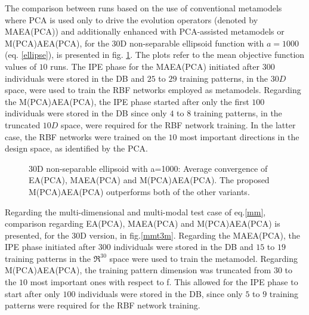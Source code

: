 The comparison between  runs based on the use of conventional metamodels where PCA is used only to drive the evolution operators (denoted by MAEA(PCA)) and additionally enhanced with PCA-assisted metamodels  or M(PCA)AEA(PCA), for the 30D non-separable ellipsoid function with $a=1000$ (eq. \ref{ellipse}), is presented in fig. \ref{Ellt3-m}. The plots refer to the mean objective function values of $10$ runs. The IPE phase for the MAEA(PCA) initiated after $300$ individuals were stored in the DB and $25$ to $29$ training patterns, in the $30D$ space, were used to train the RBF networks employed as metamodels. Regarding the M(PCA)AEA(PCA), the IPE phase started after only the first $100$ individuals were stored in the DB since only $4$ to $8$ training patterns, in the truncated  $10D$  space, were required for the RBF network training. In the latter case, the RBF networks were trained on the $10$ most important directions in the design space, as identified by the PCA. 

\begin{figure}[h!]
\begin{minipage}[b]{1\linewidth}
 \centering
\end{minipage}
\caption{30D non-separable ellipsoid with a=1000: Average convergence of EA(PCA), MAEA(PCA) and M(PCA)AEA(PCA). The proposed M(PCA)AEA(PCA) outperforms both of the other variants.} 
\label{Ellt3-m}
\end{figure}


Regarding the multi-dimensional and multi-modal test case of eq.\ref{mm}, comparison regarding EA(PCA), MAEA(PCA) and M(PCA)AEA(PCA) is presented, for the 30D version, in fig.\ref{mmt3m}. Regarding the MAEA(PCA), the  IPE phase initiated after $300$ individuals were stored in the DB and $15$ to $19$ training patterns in the $\Re^{30}$ space were used to train the  metamodel. Regarding M(PCA)AEA(PCA), the training pattern dimension was truncated from $30$ to the $10$ most important ones with respect to f. This allowed for the  IPE phase to start after only $100$ individuals were stored in the DB, since only $5$ to $9$ training patterns were required for the RBF network training.

